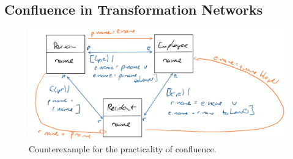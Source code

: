 


\subsection{Confluence in Transformation Networks}

\begin{figure}
    \centering
    \includegraphics[width=\textwidth]{figures/correctness/orchestration/confluence.png}
    \caption[Confluence of transformations]{Counterexample for the practicality of confluence.}
    \label{fig:orchestration:confluence}
\end{figure}

